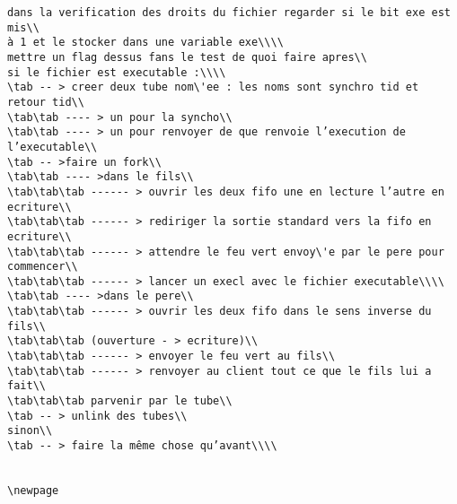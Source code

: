 \documentclass[final,twoside,onecolumn,10pt]{article}
\newcommand\tab[1][1cm]{\hspace*{#1}}
\begin{document}
\begin {verbatim}
dans la verification des droits du fichier regarder si le bit exe est mis\\
à 1 et le stocker dans une variable exe\\\\
mettre un flag dessus fans le test de quoi faire apres\\
si le fichier est executable :\\\\
\tab -- > creer deux tube nom\'ee : les noms sont synchro tid et retour tid\\
\tab\tab ---- > un pour la syncho\\
\tab\tab ---- > un pour renvoyer de que renvoie l’execution de l’executable\\
\tab -- >faire un fork\\
\tab\tab ---- >dans le fils\\
\tab\tab\tab ------ > ouvrir les deux fifo une en lecture l’autre en ecriture\\
\tab\tab\tab ------ > rediriger la sortie standard vers la fifo en ecriture\\
\tab\tab\tab ------ > attendre le feu vert envoy\'e par le pere pour commencer\\
\tab\tab\tab ------ > lancer un execl avec le fichier executable\\\\
\tab\tab ---- >dans le pere\\
\tab\tab\tab ------ > ouvrir les deux fifo dans le sens inverse du fils\\
\tab\tab\tab (ouverture - > ecriture)\\
\tab\tab\tab ------ > envoyer le feu vert au fils\\
\tab\tab\tab ------ > renvoyer au client tout ce que le fils lui a fait\\
\tab\tab\tab parvenir par le tube\\
\tab -- > unlink des tubes\\
sinon\\
\tab -- > faire la même chose qu’avant\\\\


\newpage

\end{verbatim}
\end{document}
